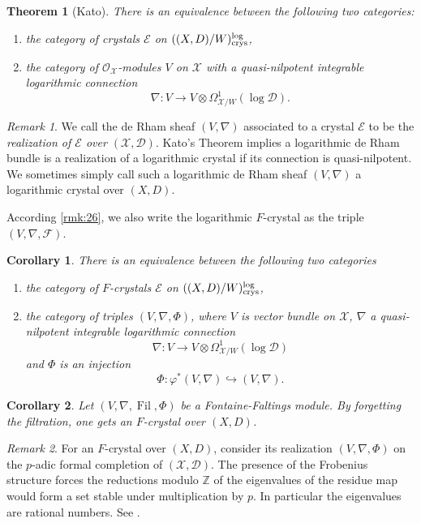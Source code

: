 \documentclass[12pt,twoside]{book}
\theoremstyle{plain}
\newtheorem{theorem}{Theorem}[section]
\newtheorem{corollary}[corollary]{Corollary}
\theoremstyle{definition}
\theoremstyle{remark}
\newtheorem{remark}[remark]{Remark}
\newcommand{\mD}{{\mathcal D}}
\newcommand{\mE}{{\mathcal E}}
\newcommand{\mF}{{\mathcal F}}
\newcommand{\mO}{{\mathcal O}}
\newcommand{\mX}{{\mathcal X}}
\DeclareMathOperator\Fil{Fil}
\numberwithin{equation}{section}
\begin{document}
\begin{theorem}[Kato] \label{thm_Kato_equivalent}
There is an equivalence between the following two categories:
\begin{enumerate}
\item[(a)] the category of crystals $\mE$ on $((X,D)/W)^{\log}_{\rm crys}$,
\item[(b)] the category of $\mO_{\mX}$-modules $V$ on $\mX$ with a quasi-nilpotent integrable logarithmic connection
\[\nabla\colon V\rightarrow V\otimes\Omega^1_{\mX/W}(\log\mD).\]
\end{enumerate}
\end{theorem}
\begin{remark} \label{rmk:26} We call the de Rham sheaf $(V,\nabla)$ associated to a crystal $\mE$ to be the \emph{realization of $\mE$ over $(\mX,\mD)$}. Kato's Theorem implies a logarithmic de Rham bundle is a realization of a logarithmic crystal if its connection is quasi-nilpotent. We sometimes simply call such a logarithmic de Rham sheaf $(V,\nabla)$ a logarithmic crystal over $(X,D)$.
\end{remark}

According \autoref{rmk:26}, we also write the logarithmic $F$-crystal as the triple $(V,\nabla,\mF)$.
\begin{corollary}
There is an equivalence between the following two categories
\begin{enumerate}
\item[$(a)$] the category of $F$-crystals $\mE$ on $((X,D)/W)^{\log}_{\rm crys}$,
\item[$(b)$] the category of triples $(V,\nabla,\Phi)$, where $V$ is vector bundle on $\mX$, $\nabla$ a quasi-nilpotent integrable logarithmic connection
\[\nabla\colon V\rightarrow V\otimes\Omega^1_{\mX/W}(\log\mD)\]
and $\Phi$ is an injection
\[\Phi\colon \varphi^*(V,\nabla)\hookrightarrow (V,\nabla).\]
\end{enumerate}
\end{corollary}

\begin{corollary}
Let $(V,\nabla,\Fil,\Phi)$ be a Fontaine-Faltings module. By forgetting the filtration, one gets an $F$-crystal over $(X,D)$.
\end{corollary}

\begin{remark}\label{rmk11}
For an $F$-crystal over $(X,D)$, consider its realization $(V,\nabla,\Phi)$ on the $p$-adic formal completion of $(\mX,\mD)$. The presence of the Frobenius structure forces the reductions modulo $\mathbb Z$ of the eigenvalues of the residue map would form a set stable under multiplication by $p$. In particular the eigenvalues are rational numbers. See \cite[7.2]{Ked22}.
\end{remark}
\end{document}
